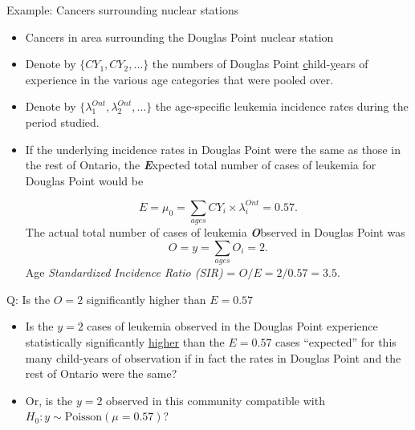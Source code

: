 \documentclass[10pt]{beamer}\usepackage[]{graphicx}\usepackage[]{color}
\begin{document}
\begin{frame}{Example: Cancers surrounding nuclear stations}
	\small
	
	\begin{itemize}
		\setlength\itemsep{.3em}
		\item Cancers in area surrounding the Douglas Point nuclear station \pause
		\item Denote by $\{CY_{1},CY_{2}, \dots \}$ the numbers of Douglas Point \underline{c}hild-\underline{y}ears of experience in the various age categories that were pooled over.  
		\item Denote by $\{\lambda^{Ont}_{1}, \lambda^{Ont}_{2},  \dots \}$ the age-specific leukemia incidence rates during the period studied. \pause
		\item If the underlying incidence rates in Douglas Point were the same as those in the rest of Ontario, the \textbf{\textit{E}}xpected total number of cases of leukemia for Douglas Point would be
		
		$$E = \mu_{0} = \sum_{ages} CY_{i} \times \lambda^{Ont}_{i}  = 0.57.$$
		\pause
		The actual total number of cases of leukemia \textbf{\textit{O}}bserved in Douglas Point was 
		$$O = y = \sum_{ages} O_{i}  = 2.$$
		\pause
		Age \textit{Standardized Incidence Ratio (SIR)} = $O/E = 2/0.57 = 3.5.$
	\end{itemize}
	
\end{frame}





\begin{frame}{Q: Is the $O=2$ significantly higher than $E=0.57$}
	
	
	\begin{itemize}
		\setlength\itemsep{1.2em}
		\item Is the $y = 2$ cases of leukemia observed in the Douglas Point experience statistically significantly \underline{higher} than the $E=0.57$  cases ``expected'' for this many child-years of  observation  if in fact the rates in Douglas Point and the rest of Ontario were the same? 
		\item Or, is the $y=2$ observed in this community compatible with $H_{0}: y \sim \textrm{Poisson}(\mu = 0.57)$?
	\end{itemize}
	
\end{frame}
\end{document}
